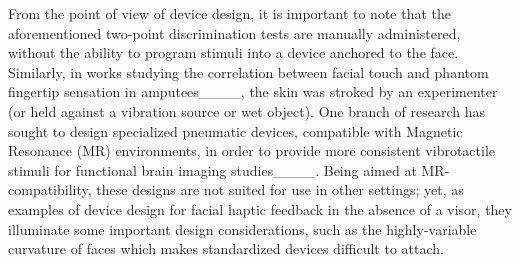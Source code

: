 From the point of view of device design, it is important to note that the aforementioned two-point discrimination tests are manually administered, without the ability to program stimuli into a device anchored to the face. Similarly, in works studying the correlation between facial touch and phantom fingertip sensation in amputees____, the skin was stroked by an experimenter (or held against a vibration source or wet object). One branch of research has sought to design specialized pneumatic devices, compatible with Magnetic Resonance (MR) environments, in order to provide more consistent vibrotactile stimuli for functional brain imaging studies____. Being aimed at MR-compatibility, these designs are not suited for use in other settings; yet, as examples of device design for facial haptic feedback in the absence of a visor, they illuminate some important design considerations, such as the highly-variable curvature of faces which makes standardized devices difficult to attach.